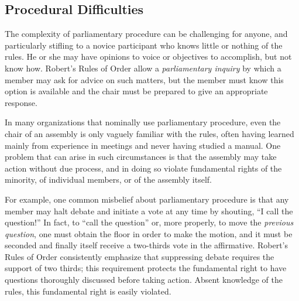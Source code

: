 \documentclass{book}
\begin{document}
\subsection{Procedural Difficulties}


The complexity of parliamentary procedure can be challenging for anyone, and particularly stifling to a novice participant who knows little or nothing of the rules. He or she may have opinions to voice or objectives to accomplish, but not know how. Robert's Rules of Order allow a \emph{parliamentary inquiry} by which a member may ask for advice on such matters, but the member must know this option is available and the chair must be prepared to give an appropriate response.


In many organizations that nominally use parliamentary procedure, even the chair of an assembly is only vaguely familiar with the rules, often having learned mainly from experience in meetings and never having studied a manual. One problem that can arise in such circumstances is that the assembly may take action without due process, and in doing so violate fundamental rights of the minority, of individual members, or of the assembly itself.

For example, one common misbelief about parliamentary procedure is that any member may halt debate and initiate a vote at any time by shouting, ``I call the question!'' In fact, to ``call the question'' or, more properly, to move the \emph{previous question}, one must obtain the floor in order to make the motion, and it must be seconded and finally itself receive a two-thirds vote in the affirmative. Robert's Rules of Order consistently emphasize that suppressing debate requires the support of two thirds; this requirement protects the fundamental right to have questions thoroughly discussed before taking action. Absent knowledge of the rules, this fundamental right is easily violated.


\end{document}
